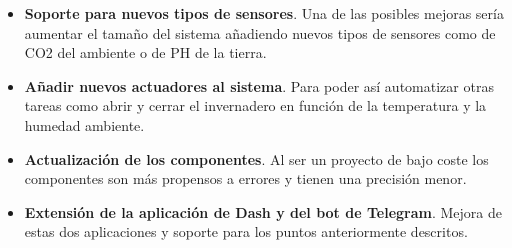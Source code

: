 \documentclass[a4paper, 12pt, oneside]{book}
\begin{document}
\begin{itemize}
\item \textbf{Soporte para nuevos tipos de sensores}. Una de las posibles mejoras sería aumentar el tamaño del sistema añadiendo nuevos tipos de sensores como de CO2 del ambiente o de PH de la tierra.

\item \textbf{Añadir nuevos actuadores al sistema}. Para poder así automatizar otras tareas como abrir y cerrar el invernadero en función de la temperatura y la humedad ambiente.

\item \textbf{Actualización de los componentes}. Al ser un proyecto de bajo coste los componentes son más propensos a errores y tienen una precisión menor.

\item \textbf{Extensión de la aplicación de Dash y del bot de Telegram}. Mejora de estas dos aplicaciones y soporte para los puntos anteriormente descritos.

\end{itemize}


\cleardoublepage
\end{document}
